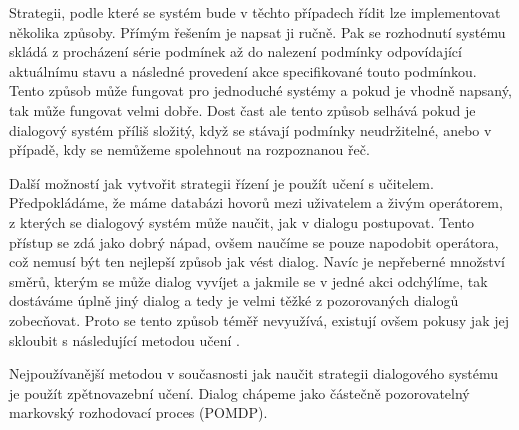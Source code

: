 Strategii, podle které se systém bude v těchto případech řídit lze
implementovat několika způsoby. Přímým řešením je napsat ji ručně. Pak se
rozhodnutí systému skládá z procházení série podmínek až do nalezení podmínky
odpovídající aktuálnímu stavu a následné provedení akce specifikované touto
podmínkou. Tento způsob může fungovat pro jednoduché systémy a pokud je vhodně
napsaný, tak může fungovat velmi dobře. Dost čast ale tento způsob selhává
pokud je dialogový systém příliš složitý, když se stávají podmínky
neudržitelné, anebo v případě, kdy se nemůžeme spolehnout na rozpoznanou řeč.

Další možností jak vytvořit strategii řízení je použít učení s učitelem.
Předpokládáme, že máme databázi hovorů mezi uživatelem a živým operátorem, z
kterých se dialogový systém může naučit, jak v dialogu postupovat. Tento
přístup se zdá jako dobrý nápad, ovšem naučíme se pouze napodobit operátora,
což nemusí být ten nejlepší způsob jak vést dialog. Navíc je nepřeberné
množství směrů, kterým se může dialog vyvíjet a jakmile se v jedné akci
odchýlíme, tak dostáváme úplně jiný dialog a tedy je velmi těžké z pozorovaných
dialogů zobecňovat. Proto se tento způsob téměř nevyužívá, existují ovšem
pokusy jak jej skloubit s následující metodou učení \cite{levin2000stochastic}.

Nejpoužívanější metodou v současnosti jak naučit strategii dialogového systému
je použít zpětnovazební učení. Dialog chápeme jako částečně pozorovatelný
markovský rozhodovací proces (POMDP).
